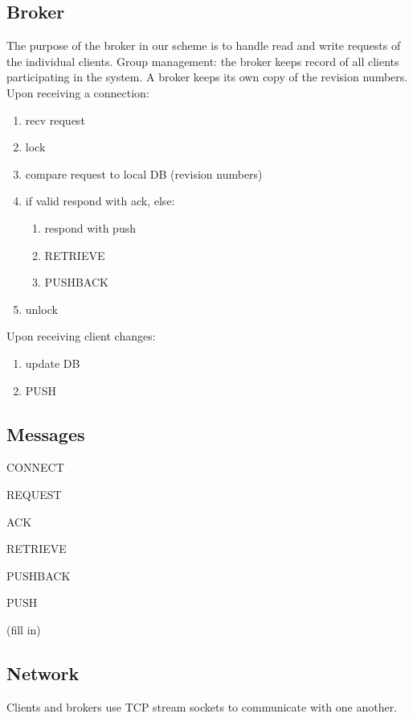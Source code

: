{    \subsection{Broker}
    The purpose of the broker in our scheme is to handle read and write requests of the individual clients. 
    Group management: the broker keeps record of all clients participating in the system.
    A broker keeps its own copy of the revision numbers.
    \newline\newline
    Upon receiving a connection:
    \begin{enumerate}
    \item recv request
    \item lock
    \item compare request to local DB (revision numbers)
    \item if valid respond with ack, else:
      \begin{enumerate}
        \item respond with push
        \item RETRIEVE
        \item PUSHBACK
    \end{enumerate}
    \item unlock
    \end{enumerate}
    Upon receiving client changes:
    \begin{enumerate}
    \item update DB
    \item PUSH
    \end{enumerate}

    \subsection{Messages}
    CONNECT

    REQUEST

    ACK

    RETRIEVE

    PUSHBACK

    PUSH

    (fill in)
    \subsection{Network}
    Clients and brokers use TCP stream sockets to communicate with one another.

}
